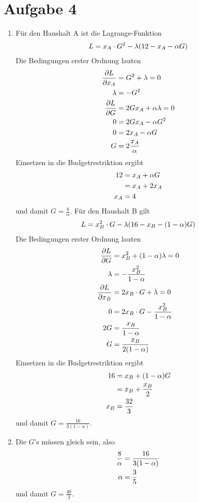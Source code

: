 \documentclass{article}
\begin{document}
	\section*{Aufgabe 4}
	\begin{enumerate}[label=(\alph*)]
		\item Für den Haushalt A ist die Lagrange-Funktion
		\begin{align}
			L = x_A\cdot G^2 - \lambda(12-x_A - \alpha G) \notag
		\end{align}
		Die Bedingungen erster Ordnung lauten
		\begin{align}
			\frac{\partial L}{\partial x_A} &= G^2 + \lambda =0 \notag \\
			\lambda &= -G^2 \notag \\
			\frac{\partial L}{\partial G} &= 2Gx_A + \alpha\lambda = 0 \notag \\
			0 &= 2Gx_A - \alpha G^2 \notag \\
			0 &= 2x_A - \alpha G \notag \\
			G &= 2\frac{x_A}{\alpha} \notag
		\end{align}
		Einsetzen in die Budgetrestriktion ergibt
		\begin{align}
			12 &= x_A + \alpha G  \notag \\
			&= x_A + 2x_A \notag \\
			x_A &= 4 \notag
		\end{align}
		und damit $G=\frac{8}{\alpha}$. Für den Haushalt B gilt
		\begin{align}
			L = x_B^2\cdot G - \lambda(16-x_B-(1-\alpha)G) \notag
		\end{align}
		Die Bedingungen erster Ordnung lauten
		\begin{align}
			\frac{\partial L}{\partial G} &= x_B^2 + (1-\alpha)\lambda = 0 \notag \\
			\lambda &= -\frac{x_B^2}{1-\alpha} \notag \\
			\frac{\partial L}{\partial x_B} &= 2x_B\cdot G + \lambda = 0 \notag \\
			0 &= 2x_B\cdot G - \frac{x_B^2}{1-\alpha} \notag \\
			2G &= \frac{x_B}{1-\alpha} \notag \\
			G &= \frac{x_B}{2(1-\alpha)} \notag
		\end{align}
		Einsetzen in die Budgetrestriktion ergibt
		\begin{align}
			16 &= x_B + (1-\alpha)G \notag \\
			&= x_B + \frac{x_B}{2} \notag \\
			x_B &= \frac{32}{3} \notag
		\end{align}
		und damit $G=\frac{16}{3(1-\alpha)}$.
		\item Die $G$'s müssen gleich sein, also
		\begin{align}
			\frac{8}{\alpha} &= \frac{16}{3(1-\alpha)} \notag \\
			\alpha &= \frac{3}{5} \notag
		\end{align}
		und damit $G=\frac{40}{3}$.
	\end{enumerate}
\end{document}
